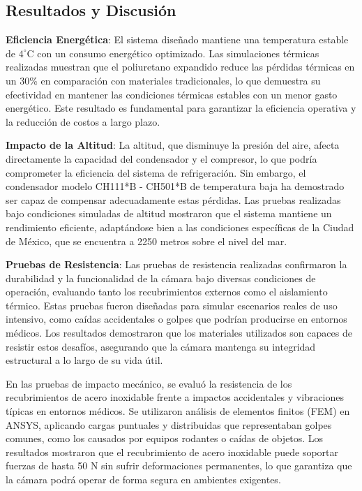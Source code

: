 \documentclass[11pt,a4paper]{article}
\begin{document}
\begin{multicols}{2}
	
\section{Resultados y Discusión}
\textbf{Eficiencia Energética}: El sistema diseñado mantiene una temperatura estable de $4^\circ$C con un consumo energético optimizado. Las simulaciones térmicas realizadas muestran que el poliuretano expandido reduce las pérdidas térmicas en un 30\% en comparación con materiales tradicionales, lo que demuestra su efectividad en mantener las condiciones térmicas estables con un menor gasto energético. Este resultado es fundamental para garantizar la eficiencia operativa y la reducción de costos a largo plazo.

\textbf{Impacto de la Altitud}: La altitud, que disminuye la presión del aire, afecta directamente la capacidad del condensador y el compresor, lo que podría comprometer la eficiencia del sistema de refrigeración. Sin embargo, el condensador modelo CH111*B - CH501*B de temperatura baja ha demostrado ser capaz de compensar adecuadamente estas pérdidas. Las pruebas realizadas bajo condiciones simuladas de altitud mostraron que el sistema mantiene un rendimiento eficiente, adaptándose bien a las condiciones específicas de la Ciudad de México, que se encuentra a 2250 metros sobre el nivel del mar.

\textbf{Pruebas de Resistencia}: Las pruebas de resistencia realizadas confirmaron la durabilidad y la funcionalidad de la cámara bajo diversas condiciones de operación, evaluando tanto los recubrimientos externos como el aislamiento térmico. Estas pruebas fueron diseñadas para simular escenarios reales de uso intensivo, como caídas accidentales o golpes que podrían producirse en entornos médicos. Los resultados demostraron que los materiales utilizados son capaces de resistir estos desafíos, asegurando que la cámara mantenga su integridad estructural a lo largo de su vida útil. 

En las pruebas de impacto mecánico, se evaluó la resistencia de los recubrimientos de acero inoxidable frente a impactos accidentales y vibraciones típicas en entornos médicos. Se utilizaron análisis de elementos finitos (FEM) en ANSYS, aplicando cargas puntuales y distribuidas que representaban golpes comunes, como los causados por equipos rodantes o caídas de objetos. Los resultados mostraron que el recubrimiento de acero inoxidable puede soportar fuerzas de hasta 50 N sin sufrir deformaciones permanentes, lo que garantiza que la cámara podrá operar de forma segura en ambientes exigentes.


\end{multicols}
\end{document}
